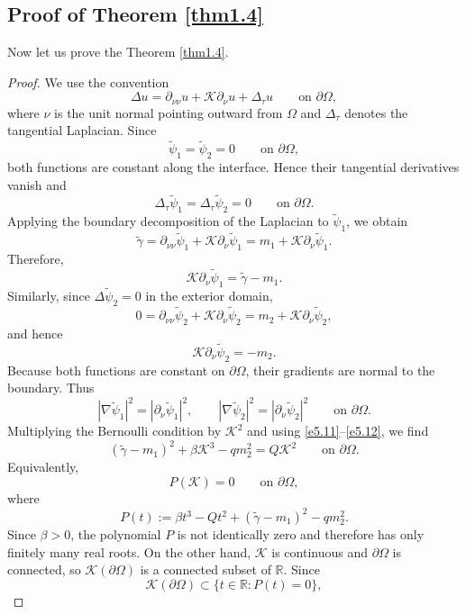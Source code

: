 \documentclass[reqno]{amsart}
\numberwithin{equation}{section}
\numberwithin{equation}{section}
\numberwithin{equation}{section}
\begin{document}
\subsection{Proof of Theorem \ref{thm1.4}}
Now let us prove the Theorem \ref{thm1.4}.
\begin{proof}
We use the convention
\[ \Delta u = \partial_{\nu\nu}u + \mathcal{K}\partial_\nu u + \Delta_{\tau}u \qquad\text{on }\partial\Omega, \]
where $\nu$ is the unit normal pointing outward from $\Omega$ and $\Delta_\tau$ denotes the tangential Laplacian. Since
\[ \widetilde{\psi}_{1}=\widetilde{\psi}_{2}=0 \qquad\text{on }\partial\Omega, \]
 both functions are constant along the interface. Hence their tangential derivatives vanish and
 \[ \Delta_\tau\widetilde{\psi}_{1} = \Delta_\tau\widetilde{\psi}_{2} =0 \qquad\text{on }\partial\Omega. \]
 Applying the boundary decomposition of the Laplacian to $\widetilde{\psi}_{1}$, we obtain
 \[ \widetilde{\gamma} = \partial_{\nu\nu}\widetilde{\psi}_{1} + \mathcal{K}\partial_\nu\widetilde{\psi}_{1} = m_1+\mathcal{K}\partial_\nu\widetilde{\psi}_{1}. \] Therefore,
 \begin{equation}\label{e5.11}
 \mathcal{K}\partial_\nu\widetilde{\psi}_{1} =  \widetilde{\gamma} -m_1.
 \end{equation}
 Similarly, since $\Delta\widetilde{\psi}_{2}=0$ in the exterior domain,
 \[ 0 = \partial_{\nu\nu}\widetilde{\psi}_{2} + \mathcal{K}\partial_\nu\widetilde{\psi}_{2} = m_2+\mathcal{K}\partial_\nu\widetilde{\psi}_{2}, \]
 and hence
 \begin{equation}\label{e5.12}
  \mathcal{K}\partial_\nu\widetilde{\psi}_{2} = -m_2.
   \end{equation}
 Because both functions are constant on $\partial\Omega$, their gradients are normal to the boundary. Thus
 \[ |\nabla\widetilde{\psi}_{1}|^2 = |\partial_\nu\widetilde{\psi}_{1}|^2, \qquad |\nabla\widetilde{\psi}_{2}|^2 = |\partial_\nu\widetilde{\psi}_{2}|^2 \qquad\text{on }\partial\Omega. \]
 Multiplying the Bernoulli condition by $\mathcal{K}^2$ and using
 \eqref{e5.11}--\eqref{e5.12}, we find
 \[ ( \widetilde{\gamma} -m_1)^2 + \beta \mathcal{K}^3 -qm_2^2 = Q\mathcal{K}^2 \qquad\text{on }\partial\Omega. \]
 Equivalently,
 \[ P(\mathcal{K})=0 \qquad\text{on }\partial\Omega, \]
 where
 \[ P(t) := \beta t^3 - Qt^2 + ( \widetilde{\gamma} -m_1)^2 -qm_2^2. \]
 Since $\beta>0$, the polynomial $P$ is not identically zero and therefore has only finitely many real roots.
 On the other hand, $\mathcal{K}$ is continuous and $\partial\Omega$ is connected, so $\mathcal{K}(\partial\Omega)$ is a connected subset of $\mathbb R$. Since \[ \mathcal{K}(\partial\Omega) \subset \{t\in\mathbb R:P(t)=0\}, \]

\end{proof}
\end{document}
